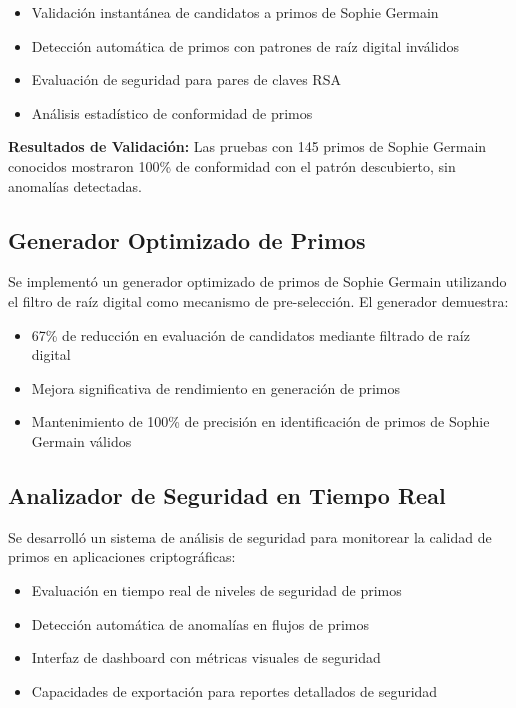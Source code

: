 \documentclass[11pt,a4paper]{article}
\theoremstyle{definition}
\theoremstyle{remark}
\begin{document}
\begin{itemize}
    \item Validación instantánea de candidatos a primos de Sophie Germain
    \item Detección automática de primos con patrones de raíz digital inválidos
    \item Evaluación de seguridad para pares de claves RSA
    \item Análisis estadístico de conformidad de primos
\end{itemize}

\textbf{Resultados de Validación:} Las pruebas con 145 primos de Sophie Germain conocidos mostraron 100\% de conformidad con el patrón descubierto, sin anomalías detectadas.

\subsection{Generador Optimizado de Primos}

Se implementó un generador optimizado de primos de Sophie Germain utilizando el filtro de raíz digital como mecanismo de pre-selección. El generador demuestra:

\begin{itemize}
    \item 67\% de reducción en evaluación de candidatos mediante filtrado de raíz digital
    \item Mejora significativa de rendimiento en generación de primos
    \item Mantenimiento de 100\% de precisión en identificación de primos de Sophie Germain válidos
\end{itemize}

\subsection{Analizador de Seguridad en Tiempo Real}

Se desarrolló un sistema de análisis de seguridad para monitorear la calidad de primos en aplicaciones criptográficas:

\begin{itemize}
    \item Evaluación en tiempo real de niveles de seguridad de primos
    \item Detección automática de anomalías en flujos de primos
    \item Interfaz de dashboard con métricas visuales de seguridad
    \item Capacidades de exportación para reportes detallados de seguridad
\end{itemize}
\end{document}
